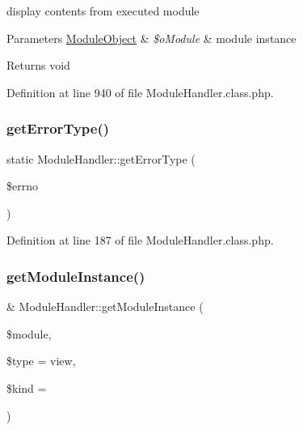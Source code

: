 display contents from executed module 
\begin{DoxyParams}[1]{Parameters}
\hyperlink{classModuleObject}{Module\+Object} & {\em \$o\+Module} & module instance \\
\hline
\end{DoxyParams}
\begin{DoxyReturn}{Returns}
void 
\end{DoxyReturn}


Definition at line 940 of file Module\+Handler.\+class.\+php.

\hypertarget{classModuleHandler_a140184b247fc515e6f49eb87ff59ae74}{}\label{classModuleHandler_a140184b247fc515e6f49eb87ff59ae74} 
\subsubsection{\texorpdfstring{get\+Error\+Type()}{getErrorType()}}
{\footnotesize\ttfamily static Module\+Handler\+::get\+Error\+Type (\begin{DoxyParamCaption}\item[{}]{\$errno }\end{DoxyParamCaption})\hspace{0.3cm}{\ttfamily [static]}}



Definition at line 187 of file Module\+Handler.\+class.\+php.

\hypertarget{classModuleHandler_a453924aa8565875e953bfc9b8870fabb}{}\label{classModuleHandler_a453924aa8565875e953bfc9b8870fabb} 
\subsubsection{\texorpdfstring{get\+Module\+Instance()}{getModuleInstance()}}
{\footnotesize\ttfamily \& Module\+Handler\+::get\+Module\+Instance (\begin{DoxyParamCaption}\item[{}]{\$module,  }\item[{}]{\$type = {\ttfamily \textquotesingle{}view\textquotesingle{}},  }\item[{}]{\$kind = {\ttfamily \textquotesingle{}\textquotesingle{}} }\end{DoxyParamCaption})}

